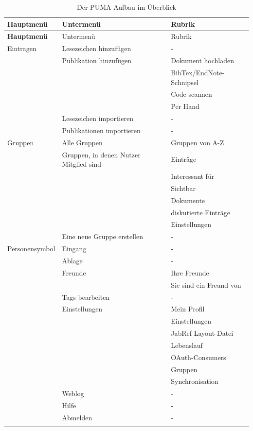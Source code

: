 \tabulinesep=1.5mm
\begin{longtabu}{|X[l]|X[l]|X[l]|}\hline
\rowfont\bfseries
Hauptmenü & Untermenü & Rubrik \\  \hline
\endfirsthead
\hline
\rowfont\bfseries
Hauptmenü & Untermenü & Rubrik \\  \hline
\endhead
\hline
\endfoot
\endlastfoot
Eintragen&Lesezeichen hinzufügen &- \\ 
&Publikation hinzufügen &Dokument hochladen \\ 
&&BibTex/EndNote-Schnipsel\\ 
&&Code scannen \\
&&Per Hand\\ 
&Lesezeichen importieren&- \\ 
&Publikationen importieren &-\\ \hline
Gruppen&Alle Gruppen& Gruppen von A-Z\\ 
&Gruppen, in denen Nutzer Mitglied sind& Einträge\\
&&Interessant für  \\ 
&&Sichtbar\\ 
&&Dokumente\\ 
&&diskutierte Einträge\\ 
&&Einstellungen\\ 
&Eine neue Gruppe erstellen&-\\ \hline
Personensymbol&Eingang&-\\ 
&Ablage&-\\ 
&Freunde&Ihre Freunde \\ 
&&Sie sind ein Freund von \\ 
&Tags bearbeiten&-\\ 
&Einstellungen&Mein Profil\\ 
&&Einstellungen\\ 
&&JabRef Layout-Datei\\
&&Lebenslauf\\ 
&&OAuth-Consumers \\
&&Gruppen\\
&&Synchronisation\\
&Weblog&-\\
&Hilfe&-\\
&Abmelden&-\\\hline
\caption{Der PUMA-Aufbau im Überblick}
\label{tab:pumaAufbau}
\end{longtabu}


